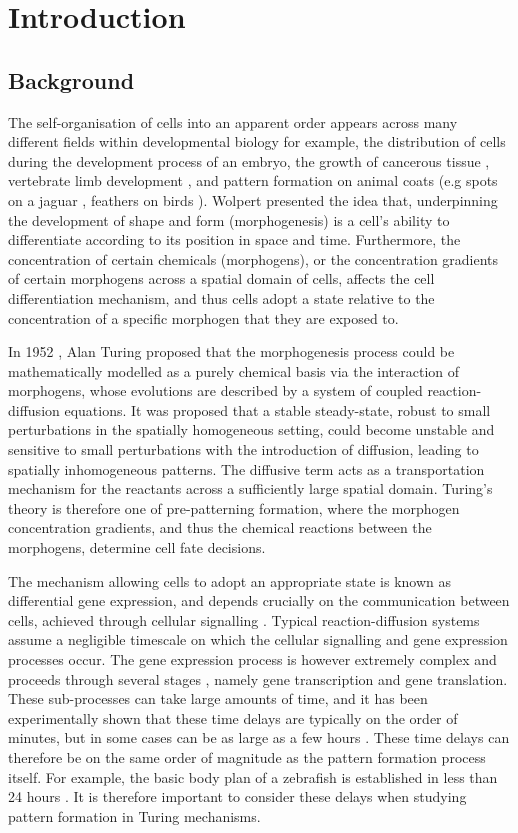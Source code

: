 \chapter{Introduction}

\section{Background}

The self-organisation of cells into an apparent order appears across many different fields within developmental biology for example, the distribution of cells during the development process of an embryo, the growth of cancerous tissue \cite{morph}, vertebrate limb development \cite{miura1,glimm,miura2}, and pattern formation on animal coats (e.g spots on a jaguar \cite{painter}, feathers on birds \cite{bailleul}). Wolpert \cite{wolpert} presented the idea that, underpinning the development of shape and form (morphogenesis) is a cell's ability to differentiate according to its position in space and time. Furthermore, the concentration of certain chemicals (morphogens), or the concentration gradients of certain morphogens across a spatial domain of cells, affects the cell differentiation mechanism, and thus cells adopt a state relative to the concentration of a specific morphogen that they are exposed to.

In 1952 \cite{turing}, Alan Turing proposed that the morphogenesis process could be mathematically modelled as a purely chemical basis via the interaction of morphogens, whose evolutions are described by a system of coupled reaction-diffusion equations. It was proposed that a stable steady-state, robust to small perturbations in the spatially homogeneous setting, could become unstable and sensitive to small perturbations with the introduction of diffusion, leading to spatially inhomogeneous patterns. The diffusive term acts as a transportation mechanism for the reactants across a sufficiently large spatial domain. Turing's theory is therefore one of pre-patterning formation, where the morphogen concentration gradients, and thus the chemical reactions between the morphogens, determine cell fate decisions.

The mechanism allowing cells to adopt an appropriate state is known as differential gene expression, and depends crucially on the communication between cells, achieved through cellular signalling \cite{gaffmonk}. Typical reaction-diffusion systems assume a negligible timescale on which the cellular signalling and gene expression processes occur. The gene expression process is however extremely complex and proceeds through several stages \cite{gaffmonk}, namely gene transcription and gene translation. These sub-processes can take large amounts of time, and it has been experimentally shown that these time delays are typically on the order of minutes, but in some cases can be as large as a few hours \cite{gaffmonk,tennyson}. These time delays can therefore be on the same order of magnitude as the pattern formation process itself. For example, the basic body plan of a zebrafish is established in less than 24 hours \cite{gaffmonk,kimmel}. It is therefore important to consider these delays when studying pattern formation in Turing mechanisms.

